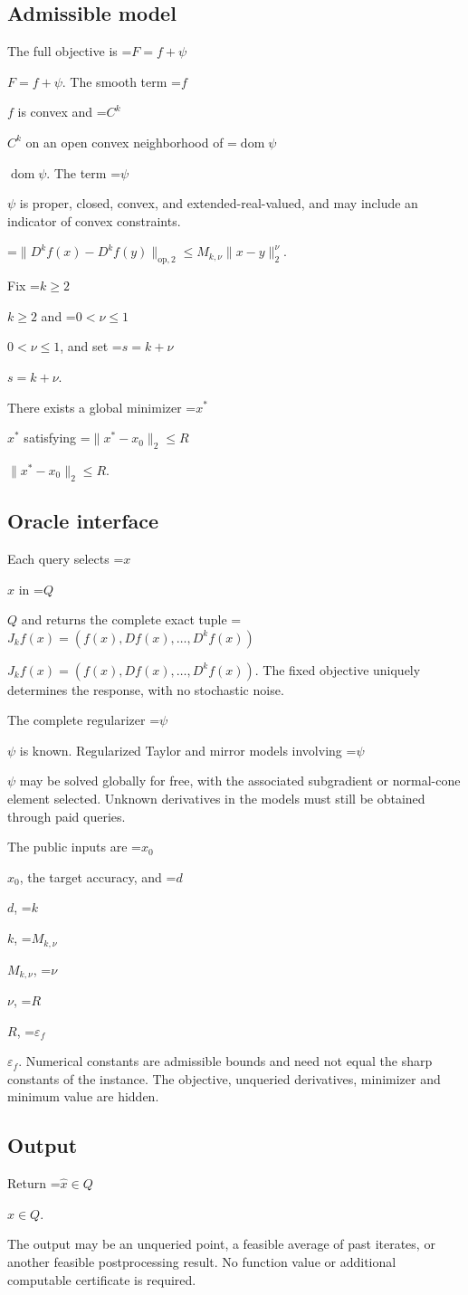 \documentclass[10pt,a4paper]{article}
\newcommand{\AtlasMath}[1]{\par\begingroup\centering\setbox0=\hbox{$\displaystyle #1$}\ifdim\wd0>1.4\linewidth\typeout{ATLAS WIDE FORMULA: \the\wd0}\fi\ifdim\wd0>\linewidth\resizebox{\linewidth}{!}{\box0}\else\box0\fi\par\endgroup}
\newcommand{\AtlasInlineMath}[1]{\begingroup\setbox0=\hbox{$#1$}\ifdim\wd0>.4\linewidth\endgroup\AtlasMath{#1}\else\endgroup$#1$\fi}
\begin{document}
\subsection{Admissible model}
The full objective is \AtlasInlineMath{F=f+\psi}. The smooth term \AtlasInlineMath{f} is convex and \AtlasInlineMath{C^k} on an open convex neighborhood of \AtlasInlineMath{\operatorname{dom}\psi}. The term \AtlasInlineMath{\psi} is proper, closed, convex, and extended-real-valued, and may include an indicator of convex constraints.


\AtlasMath{\|D^{k}f(x)-D^{k}f(y)\|_{\mathrm{op},2}\le M_{k,\nu}\|x-y\|_{2}^{\nu}.}


Fix \AtlasInlineMath{k\ge2} and \AtlasInlineMath{0<\nu\le1}, and set \AtlasInlineMath{s=k+\nu}.

There exists a global minimizer \AtlasInlineMath{x^*} satisfying \AtlasInlineMath{\|x^*-x_0\|_2\le R}.

\subsection{Oracle interface}
Each query selects \AtlasInlineMath{x} in \AtlasInlineMath{Q} and returns the complete exact tuple \AtlasInlineMath{J_{k}f(x)=(f(x),Df(x),\ldots,D^{k}f(x))}. The fixed objective uniquely determines the response, with no stochastic noise.

The complete regularizer \AtlasInlineMath{\psi} is known. Regularized Taylor and mirror models involving \AtlasInlineMath{\psi} may be solved globally for free, with the associated subgradient or normal-cone element selected. Unknown derivatives in the models must still be obtained through paid queries.

The public inputs are \AtlasInlineMath{x_0}, the target accuracy, and \AtlasInlineMath{d}, \AtlasInlineMath{k}, \AtlasInlineMath{M_{k,\nu}}, \AtlasInlineMath{\nu}, \AtlasInlineMath{R}, \AtlasInlineMath{\varepsilon_f}. Numerical constants are admissible bounds and need not equal the sharp constants of the instance. The objective, unqueried derivatives, minimizer and minimum value are hidden.

\subsection{Output}
Return \AtlasInlineMath{\widehat{x}\in Q}.

The output may be an unqueried point, a feasible average of past iterates, or another feasible postprocessing result. No function value or additional computable certificate is required.
\end{document}
